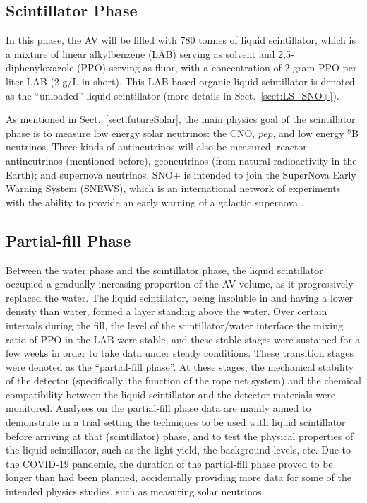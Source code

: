 \subsection{Scintillator Phase} \label{sect:scintPhase}

In this phase, the AV will be filled with 780 tonnes of liquid scintillator, which is a mixture of linear alkylbenzene (LAB) serving as solvent and 2,5-diphenyloxazole (PPO) serving as fluor, with a concentration of 2 gram PPO per liter LAB (2 g/L in short). This LAB-based organic liquid scintillator is denoted as the ``unloaded'' liquid scintillator (more details in Sect.~\ref{sect:LS_SNO+}).

As mentioned in Sect.~\ref{sect:futureSolar}, the main physics goal of the scintillator phase is to measure low energy solar neutrinos: the CNO, $pep$, and low energy $^8$B neutrinos. Three kinds of antineutrinos will also be measured: reactor antineutrinos (mentioned before), geoneutrinos (from natural radioactivity in the Earth); and supernova neutrinos. SNO+ is intended to join the SuperNova Early Warning System (SNEWS), which is an international network of experiments with the ability to provide an early warning of a galactic supernova \cite{snop_jinst,rumleskie2021sno+}.

\subsection{Partial-fill Phase} \label{sect:partialPhase}

Between the water phase and the scintillator phase, the liquid scintillator occupied a gradually increasing proportion of the AV volume, as it progressively replaced the water. The liquid scintillator, being insoluble in and having a lower density than water, formed a layer standing above the water. Over certain intervals during the fill, the level of the scintillator/water interface the mixing ratio of PPO in the LAB were stable, and these stable stages were sustained for a few weeks in order to take data under steady conditions. These transition stages were denoted as the ``partial-fill phase''. At these stages, the mechanical stability of the detector (specifically, the function of the rope net system) and the chemical compatibility between the liquid scintillator and the detector materials were monitored. Analyses on the partial-fill phase data are mainly aimed to demonstrate in a trial setting the techniques to be used with liquid scintillator before arriving at that (scintillator) phase, and to test the physical properties of the liquid scintillator, such as the light yield, the background levels, etc. Due to the COVID-19 pandemic, the duration of the partial-fill phase proved to be longer than had been planned, accidentally providing more data for some of the intended physics studies, such as measuring solar neutrinos.

